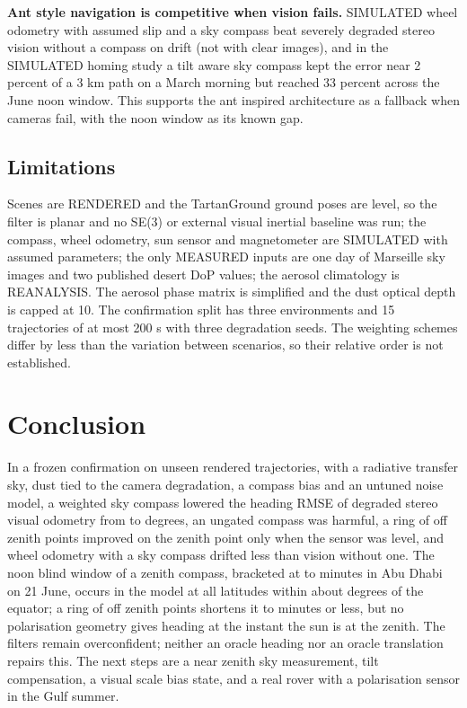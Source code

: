 \textbf{Ant style navigation is competitive when vision fails.} SIMULATED wheel odometry with assumed slip and a sky compass beat severely degraded stereo vision without a compass on drift (not with clear images), and in the SIMULATED homing study a tilt aware sky compass kept the error near 2 percent of a 3 km path on a March morning but reached 33 percent across the June noon window. This supports the ant inspired architecture as a fallback when cameras fail, with the noon window as its known gap.

\subsection*{Limitations}
Scenes are RENDERED and the TartanGround ground poses are level, so the filter is planar and no SE(3) or external visual inertial baseline was run; the compass, wheel odometry, sun sensor and magnetometer are SIMULATED with assumed parameters; the only MEASURED inputs are one day of Marseille sky images and two published desert DoP values; the aerosol climatology is REANALYSIS. The aerosol phase matrix is simplified and the dust optical depth is capped at 10. The confirmation split has three environments and 15 trajectories of at most 200 s with three degradation seeds. The weighting schemes differ by less than the variation between scenarios, so their relative order is not established.

\section{Conclusion}
In a frozen confirmation on \sNconf{} unseen rendered trajectories, with a radiative transfer sky, dust tied to the camera degradation, a compass bias and an untuned noise model, a weighted sky compass lowered the heading RMSE of degraded stereo visual odometry from \sHoneB{} to \sHoneA{} degrees, an ungated compass was harmful, a ring of off zenith points improved on the zenith point only when the sensor was level, and wheel odometry with a sky compass drifted less than vision without one. The noon blind window of a zenith compass, bracketed at \sWinAnch{} to \sWinRT{} minutes in Abu Dhabi on 21 June, occurs in the model at all latitudes within about \sLatMax{} degrees of the equator; a ring of off zenith points shortens it to minutes or less, but no polarisation geometry gives heading at the instant the sun is at the zenith. The filters remain overconfident; neither an oracle heading nor an oracle translation repairs this. The next steps are a near zenith sky measurement, tilt compensation, a visual scale bias state, and a real rover with a polarisation sensor in the Gulf summer.
